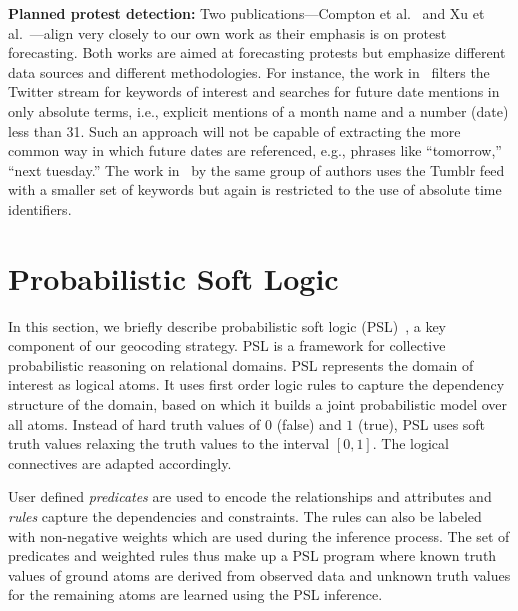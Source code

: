 \documentclass[letterpaper]{article}
\begin{document}
{\bf Planned protest detection:}
Two publications---Compton et al.~ and
Xu et al.~---align very closely to our own work
as their emphasis is on protest forecasting.  Both works are aimed at
forecasting protests but emphasize different data sources and different
methodologies. For instance, the work in~\cite{compton2013detecting}
filters the Twitter stream for keywords of interest and searches for
future date mentions in only absolute terms, i.e., explicit mentions of
a month name and a number (date) less than 31.  Such an approach will
not be capable of extracting the more common way in which future dates
are referenced, e.g., phrases like ``tomorrow,'' ``next tuesday.'' The
work in~\cite{xu2014civil} by the same group of authors uses the Tumblr
feed with a smaller set of keywords but again is restricted to the use
of absolute time identifiers.

\section{Probabilistic Soft Logic}
  \label{section:PSL}
In this section, we briefly describe probabilistic soft logic
(PSL)~\cite{kimmig2012short}, a key component of our geocoding strategy.
PSL is a framework for collective probabilistic reasoning on relational
domains.  PSL represents the domain of interest as logical atoms.  It
uses first order logic rules to capture the dependency structure of the
domain, based on which it builds a joint probabilistic model over all
atoms.  Instead of hard truth values of $0$ (false) and $1$ (true), PSL
uses soft truth values relaxing the truth values to the interval
$[0,1]$.  The logical connectives are adapted accordingly.

User defined \emph{predicates} are used to encode the relationships and
attributes and \emph{rules} capture the  dependencies and constraints.
The rules can also be labeled with non-negative weights which are used
during the inference process.  The set of predicates and weighted rules
thus make up a PSL program where known truth values of ground atoms
 are derived from observed data and unknown truth values for the remaining
atoms are learned using the PSL inference.
\end{document}
